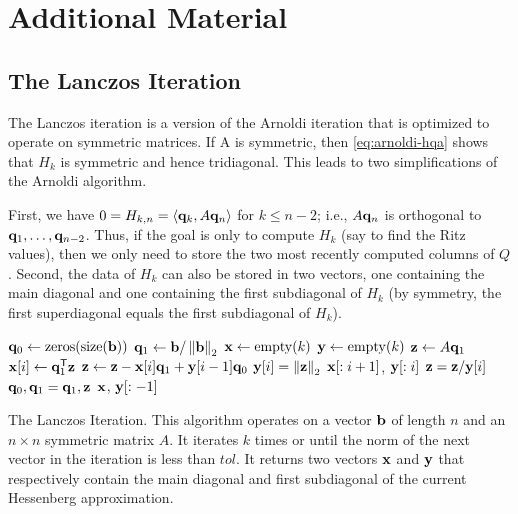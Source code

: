 \section*{Additional Material} %

\subsection*{The Lanczos Iteration} %

The Lanczos iteration is a version of the Arnoldi iteration that is optimized to operate on symmetric matrices.
If A is symmetric, then \eqref{eq:arnoldi-hqa} shows that $H_k$ is symmetric and hence tridiagonal.
This leads to two simplifications of the Arnoldi algorithm.

First, we have $0=H_{k, n}=\langle \mathbf{q}_k, A\mathbf{q}_n \rangle$ for $k \leq n-2$; i.e., $A\mathbf{q}_n$ is orthogonal to $\mathbf{q}_1, \ldots, \mathbf{q}_{n-2}$.
Thus, if the goal is only to compute $H_k$ (say to find the Ritz values), then we only need to store the two most recently computed columns of $Q$.
Second, the data of $H_k$ can also be stored in two vectors, one containing the main diagonal and one containing the first subdiagonal of $H_k$
(by symmetry, the first superdiagonal equals the first subdiagonal of $H_k$).

\begin{algorithm}[H]
\begin{algorithmic}[1]
	\State $\q_0 \gets \zeros{\size{\b}}$								
	\State $\mathbf{q}_1 \gets \mathbf{b}/\left\lVert\mathbf{b}\right\rVert_2$
	\State $\x \gets \allocate{k}$
	\State $\y \gets \allocate{k}$
										
		\State $\mathbf{z} \gets A\mathbf{q}_1$					
		\State $\mathbf{x}[i] \gets \mathbf{q}_1^{\mathsf T} \mathbf{z}$				
		\State $\mathbf{z} \gets \mathbf{z} - \mathbf{x}[i] \mathbf{q}_1 + \mathbf{y}[i-1] \mathbf{q}_0$				
		\State $\mathbf{y}[i] = \left\lVert\mathbf{z}\right\rVert_2$						
										
			\State {} $\mathbf{x}[: i+1]$, $\mathbf{y}[: i]$
		\EndIf
		\State $\mathbf{z} = \mathbf{z}/ \mathbf{y}[i]$
		\State $\mathbf{q}_0, \mathbf{q}_1 = \mathbf{q}_1, \mathbf{z}$						
	\EndFor
	\State {} $\mathbf{x}$, $\mathbf{y}[: -1]$
\EndProcedure
\end{algorithmic}
\caption{The Lanczos Iteration. This algorithm operates on a vector $\mathbf{b}$ of length $n$ and an $n \times n$ symmetric matrix $A$. It iterates $k$ times or until the norm of the next vector in the iteration is less than $tol$. It returns two vectors $\mathbf{x}$ and $\mathbf{y}$ that respectively contain the main diagonal and first subdiagonal of the current Hessenberg approximation.}
\label{alg:lanczos_iteration}
\end{algorithm}

